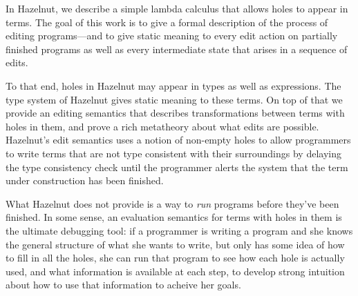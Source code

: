 In Hazelnut, we describe a simple lambda calculus that allows holes to
appear in terms. The goal of this work is to give a formal description of
the process of editing programs---and to give static meaning to every edit
action on partially finished programs as well as every intermediate state
that arises in a sequence of edits.

To that end, holes in Hazelnut may appear in types as well as
expressions. The type system of Hazelnut gives static meaning to these
terms. On top of that we provide an editing semantics that describes
transformations between terms with holes in them, and prove a rich
metatheory about what edits are possible. Hazelnut's edit semantics uses a
notion of non-empty holes to allow programmers to write terms that are not
type consistent with their surroundings by delaying the type consistency
check until the programmer alerts the system that the term under
construction has been finished.

What Hazelnut does not provide is a way to \emph{run} programs before
they've been finished. In some sense, an evaluation semantics for terms
with holes in them is the ultimate debugging tool: if a programmer is
writing a program and she knows the general structure of what she wants to
write, but only has some idea of how to fill in all the holes, she can run
that program to see how each hole is actually used, and what information is
available at each step, to develop strong intuition about how to use that
information to acheive her goals.
